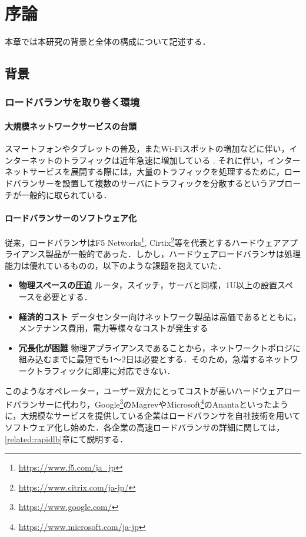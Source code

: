 \chapter{序論}
\label{introduction}
本章では本研究の背景と全体の構成について記述する．

\section{背景}
\label{introduction:background}


\subsection{ロードバランサを取り巻く環境}

\subsubsection{大規模ネットワークサービスの台頭}
スマートフォンやタブレットの普及，またWi-Fiスポットの増加などに伴い，インターネットのトラフィックは近年急速に増加している \cite{Cisco_Analysis}.
それに伴い，インターネットサービスを展開する際には，大量のトラフィックを処理するために，ロードバランサーを設置して複数のサーバにトラフィックを分散するというアプローチが一般的に取られている．

\subsubsection{ロードバランサーのソフトウェア化}
従来，ロードバランサはF5 Networks\footnote{\url{https://www.f5.com/ja_jp}}, Cirtix\footnote{\url{https://www.citrix.com/ja-jp/}}等を代表とするハードウェアアプライアンス製品が一般的であった．しかし，ハードウェアロードバランサは処理能力は優れているものの，以下のような課題を抱えていた．
\begin{itemize}
    \item \textbf{物理スペースの圧迫}
    ルータ，スイッチ，サーバと同様，1U以上の設置スペースを必要とする．
    \item \textbf{経済的コスト}
    データセンター向けネットワーク製品は高価であるとともに，メンテナンス費用，電力等様々なコストが発生する
    \item \textbf{冗長化が困難}
    物理アプライアンスであることから，ネットワークトポロジに組み込むまでに最短でも1〜2日は必要とする．そのため，急増するネットワークトラフィックに即座に対応できない．
\end{itemize}

このようなオペレーター，ユーザー双方にとってコストが高いハードウェアロードバランサーに代わり，Google\footnote{\url{https://www.google.com/}}のMagrev\cite{Magrev}やMicrosoft\footnote{\url{https://www.microsoft.com/ja-jp}}のAnanta\cite{ananta}といったように，大規模なサービスを提供している企業はロードバランサを自社技術を用いてソフトウェア化し始めた．各企業の高速ロードバランサの詳細に関しては，\ref{related:rapidlb}章にて説明する．



